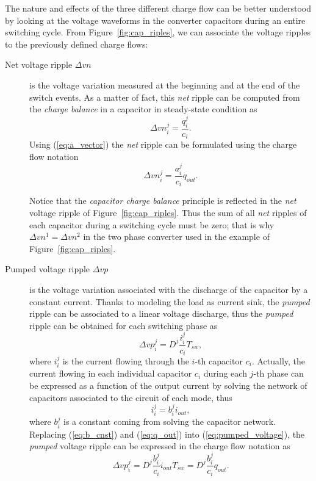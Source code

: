 The nature and effects of the three different charge flow can be better understood by looking at the voltage waveforms in the converter capacitors during an entire switching cycle. From Figure~\ref{fig:cap_riples}, we can associate the voltage ripples to the previously defined charge flows:
\begin{description}
  \item[Net voltage ripple $\Delta vn$] is the voltage variation measured at the beginning and at the end of the switch events. As a matter of fact, this \emph{net} ripple can be computed from the \emph{charge balance} in a capacitor in steady-state condition as
      \begin{equation}
        \Delta {vn}^j_i  = \frac{q_i ^j }{c_i}.
        \label{eq:net_voltage}
      \end{equation}
      Using (\ref{eq:a_vector}) the \emph{net} ripple can be formulated using the charge flow notation
      \begin{equation}
        \Delta {vn}^j_i  = \frac{a_i ^j }{c_i} {q_{out}}.
        \label{eq:net_voltage_cf}
      \end{equation}

      Notice that the \emph{capacitor charge balance} principle is reflected in the \emph{net }voltage ripple of Figure~\ref{fig:cap_riples}. Thus the sum of all \emph{net} ripples of each capacitor during a switching cycle  must be zero; that is why $\Delta vn^1 = \Delta vn^2$ in the two phase converter used in the example of Figure~\ref{fig:cap_riples}.

  \item[Pumped voltage ripple $\Delta vp$] is the voltage variation associated with the discharge of the capacitor by a constant current. Thanks to modeling the load as current sink, the \emph{pumped} ripple can be associated to a linear voltage discharge, thus the \emph{pumped} ripple can be obtained for each switching phase as
      \begin{equation}
        \Delta {vp}^j_i  = D^j \frac{i_i^j}{c_i }T_{sw},
      \label{eq:pumped_voltage}
      \end{equation}
      where $i_i^j$ is the current flowing through the $i$-th capacitor $c_i$. Actually, the current flowing in each individual capacitor $c_i$ during each $j$-th phase can be expressed as a function of the output current by solving the network of capacitors associated to the circuit of each mode, thus
      \begin{equation}
        i_i^j = b_i^j i_{out} ,
      \label{eq:b_cnst}
      \end{equation}
      where $ b_i^j $ is a constant coming from solving the capacitor network.  Replacing (\ref{eq:b_cnst}) and (\ref{eq:q_out}) into (\ref{eq:pumped_voltage}), the \emph{pumped} voltage ripple can be expressed in the charge flow notation as
      \begin{equation}
        \Delta {vp}^j_i  = D^j \frac{b_i^j}{c_i } {i_{out}} {T_{sw}} = D^j \frac{b_i^j}{c_i } {q_{out}}.
      \label{eq:pumped_voltage_cf}
      \end{equation}


\end{description}
